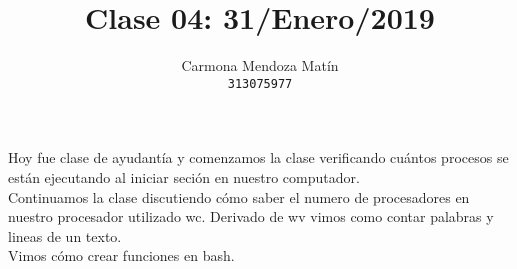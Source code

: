 \documentclass[11pt, a4paper]{report}
\begin{document}
\title{Clase 04: 31/Enero/2019}
\author{
  Carmona Mendoza Mat\'in\\
  \texttt{313075977}
}
\date{}
\maketitle

Hoy fue clase de ayudant\'ia y comenzamos la clase verificando cuántos procesos se est\'an 
ejecutando al iniciar seci\'on en nuestro computador.\\

Continuamos la clase discutiendo c\'omo saber el numero de procesadores en nuestro procesador 
utilizado wc. Derivado de wv vimos como contar palabras y lineas de un texto.\\

Vimos c\'omo crear funciones en bash.
  
\end{document}
